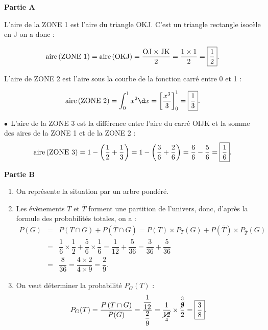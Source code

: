 \smallskip

\textbf{Partie A}

\medskip

L'aire de la ZONE 1 est l'aire du triangle OKJ. C'est un triangle rectangle isocèle en J on a donc :

\[\text{aire\,(ZONE 1)} = \text{aire\,(OKJ)} = \dfrac{\mathrm{OJ} \times \mathrm{JK}}{2} = \dfrac{1\times 1}{2} = \boxed{\dfrac{1}{2}}.\]

\smallskip

L'aire de ZONE 2 est l'aire sous la courbe de la fonction carré entre 0 et 1 :

\[\text{aire\,(ZONE 2)} = \int_{0}^{1}x^{2}\d x = \left[\dfrac{x^{3}}{3}\right]_{0}^{1} = \boxed{\dfrac{1}{3}}.\]
\smallskip

$\bullet~~$L'aire de la ZONE 3 est la différence entre l'aire du carré OIJK et la somme des aires de la ZONE 1 et de la ZONE 2 :
\[\text{aire\,(ZONE 3)} = 1  - \left(\dfrac{1}{2} + \dfrac{1}{3}\right) = 1 - \left(\dfrac{3}{6} + \dfrac{2}{6}\right) = \dfrac{6}{6} - \dfrac{5}{6} = \boxed{\dfrac{1}{6}}.\]

%

\medskip

\textbf{Partie B}

\medskip

\begin{enumerate}
	\item On représente la situation par un arbre pondéré.
	
	\begin{center}
	\end{center}
	\item Les évènements $T$ et $\overline{T}$ forment une partition de l'univers, donc, d'après la formule des probabilités totales, on a :
	\begin{eqnarray*}
		P(G) &=& P\left(T \cap G\right) + P\left(\overline{T} \cap G\right) = P(T) \times P_{T}(G) + P\left(\overline{T}\right) \times P_{\overline{T}}(G)\\
		&=& \dfrac{1}{6} \times \dfrac{1}{2} + \dfrac{5}{6} \times \dfrac{1}{6} = \dfrac{1}{12} + \dfrac{5}{36} = \dfrac{3}{36} + \dfrac{5}{36}\\
		&=& \dfrac{8}{36} = \dfrac{4 \times 2}{4 \times 9} =  \boxed{\dfrac{2}{9}}.
	\end{eqnarray*}
	\item On veut déterminer la probabilité $P_{G}(T)$ :
	\[P_{G}(T) = \dfrac{P\left(T \cap G\right)}{P(G)} = \dfrac{\dfrac{1}{12}}{\dfrac{2}{9}} = \dfrac{1}{\underset{4}{\cancel{12}}} \times \dfrac{\overset{3}{\cancel{9}}}{2} = \boxed{\dfrac{3}{8}}.\]
\end{enumerate}

